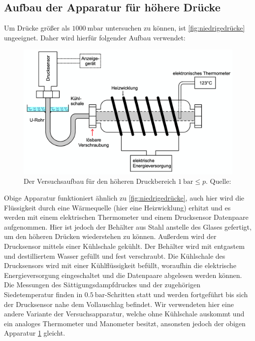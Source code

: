     \subsection{Aufbau der Apparatur für höhere Drücke}
    Um Drücke größer als $\SI{1000}{\milli\bar}$ untersuchen zu können, ist \ref{fig:niedrigedrücke} ungeeignet. Daher wird
    hierfür folgender Aufbau verwendet:
    \begin{figure}
      \centering
      \includegraphics[scale=0.4]{Content/apparaturhohe.png}
      \caption{Der Versuchsaufbau für den höheren Druckbereich $\SI{1}{\bar} \leq p $. Quelle: \cite{AP01}}
      \label{fig:hohedrücke}
    \end{figure}
    Obige Apparatur funktioniert ähnlich zu \ref{fig:niedrigedrücke}, auch hier wird die Flüssigkeit durch eine Wärmequelle
    (hier eine Heizwicklung) erhitzt und es werden mit einem elektrischen Thermometer und einem Drucksensor Datenpaare
    aufgenommen. Hier ist jedoch der Behälter aus Stahl anstelle des Glases gefertigt, um den höheren Drücken wiederstehen zu
    können. Außerdem wird der Drucksensor mittels einer Kühlschale gekühlt. Der Behälter wird mit entgastem und destilliertem
    Wasser gefüllt und fest verschraubt. Die Kühlschale des Drucksensors wird mit einer Kühlflüssigkeit befüllt, woraufhin die
    elektrische Energieversorgung eingeschaltet und die Datenpaare abgelesen werden können. Die Messungen des
    Sättigungsdampfdruckes und der zugehörigen Siedetemperatur finden in $\SI{0.5}{\bar}$-Schritten statt und werden fortgeführt
    bis sich der Drucksensor nahe dem Vollauschlag befindet. Wir verwendeten hier eine andere Variante der Versuchsapparatur,
    welche ohne Kühlschale auskommt und ein analoges Thermometer und Manometer besitzt, ansonsten jedoch der obigen Apparatur
    \ref{fig:hohedrücke} gleicht.
\label{sec:Durchführung}
